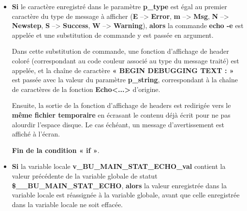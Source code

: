 \documentclass[a4paper,10pt]{article}
\begin{document}
\begin{itemize}
{\begin{itemize}
            \item
            {
                \setlength{\parskip}{2em}

                \begin{justify}
                    \textbf{\color{cond}Si} le caractère enregistré dans le paramètre \textbf{\color{vars}p\_type} est égal au premier caractère du type de message à afficher (\textbf{E} --> \textbf{Error}, \textbf{m} --> \textbf{Msg}, \textbf{N} --> \textbf{Newstep}, \textbf{S} --> \textbf{Success}, \textbf{W} --> \textbf{Warning}), \textbf{\color{cond}alors} la commande \textbf{\color{cmds}echo -e} est appelée et une substitution de commande y est passée en argument.
                \end{justify}

                \setlength{\parskip}{1em}

                \begin{justify}
                    Dans cette substitution de commande, une fonction d'affichage de header coloré (correspondant au code couleur associé au type du message traité) est appelée, et la chaîne de caractère \textbf{« BEGIN DEBUGGING TEXT : »} est passée avec la valeur du paramètre \textbf{\color{vars}p\_string}, correspondant à la chaîne de caractères de la fonction \textbf{\color{func}Echo<...>} d'origine.
                \end{justify}

                \begin{justify}
                    Ensuite, la sortie de la fonction d'affichage de headers est redirigée vers le \textbf{\color{path}même fichier temporaire} en écrasant le contenu déjà écrit pour ne pas alourdir l'espace disque. Le cas échéant, un message d'avertissement est affiché à l'écran.
                \end{justify}

                \begin{justify}
                    \textbf{\color{cond}Fin de la condition « if »}.
                \end{justify}
            }

            \item
            {
                \setlength{\parskip}{2em}

                \begin{justify}
                    \textbf{\color{cond}Si} la variable locale \textbf{\color{vars}v\_BU\_MAIN\_STAT\_ECHO\_val} contient la valeur précédente de la variable globale de statut \textbf{\color{vars}\$\_\_BU\_MAIN\_STAT\_ECHO}, \textbf{\color{cond}alors} la valeur enregistrée dans la variable locale est réassignée à la variable globale, avant que celle enregistrée dans la variable locale ne soit effacée.
                \end{justify}\setlength{\parskip}{1em}

}
\end{itemize}}
\end{itemize}
\end{document}
